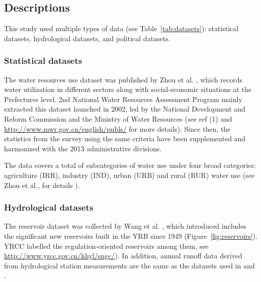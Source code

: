 \subsection*{Descriptions}
This study used multiple types of data (see Table~\ref{tab:datasets}): statistical datasets, hydrological datasets, and political datasets.

\subsubsection*{Statistical datasets}
The water resources use dataset was published by Zhou et al. \cite{zhou2020}, which records water utilization in different sectors along with social-economic situations at the Prefectures level. 2nd National Water Resources Assessment Program mainly extracted this dataset launched in 2002, led by the National Development and Reform Commission and the Ministry of Water Resources (see ref (1) and \url{http://www.mwr.gov.cn/english/publs/} for more details). Since then, the statistics from the survey using the same criteria have been supplemented and harmonized with the 2013 administrative divisions.

The data covers a total of subcategories of water use under four broad categories: agriculture (IRR), industry (IND), urban (URB) and rural (RUR) water use (see Zhou et al., for details \cite{zhou2020}).

\subsubsection*{Hydrological datasets}
The reservoir dataset was collected by Wang et al. \cite{wang2019c}, which introduced includes the significant new reservoirs built in the YRB since 1949 (Figure~\ref{fig:reservoirs}). YRCC labelled the regulation-oriented reservoirs among them, see \url{http://www.yrcc.gov.cn/hhyl/sngc/}). In addition, annual runoff data derived from hydrological station measurements are the same as the datasets used in \cite{wang2019c} and \cite{wang2016e}.

